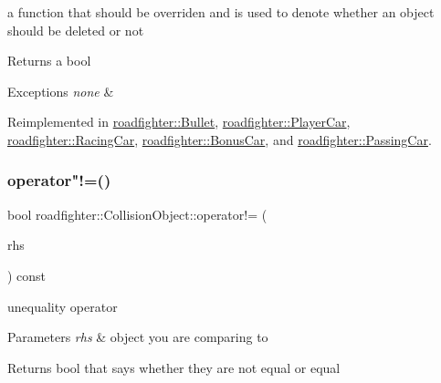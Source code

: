 a function that should be overriden and is used to denote whether an object should be deleted or not \begin{DoxyReturn}{Returns}
a bool 
\end{DoxyReturn}

\begin{DoxyExceptions}{Exceptions}
{\em none} & \\
\hline
\end{DoxyExceptions}


Reimplemented in \hyperlink{classroadfighter_1_1Bullet_a0f87b693a1583522e551ba1324fcd067}{roadfighter\+::\+Bullet}, \hyperlink{classroadfighter_1_1PlayerCar_aaf4dc181a4d21e544aecd7a8e538cfd6}{roadfighter\+::\+Player\+Car}, \hyperlink{classroadfighter_1_1RacingCar_a300bccb330cc8e84834edd5f85354a10}{roadfighter\+::\+Racing\+Car}, \hyperlink{classroadfighter_1_1BonusCar_a19d01e92134634a82ae53f0d017956aa}{roadfighter\+::\+Bonus\+Car}, and \hyperlink{classroadfighter_1_1PassingCar_a96b365c19d4e6e940d3827319434a022}{roadfighter\+::\+Passing\+Car}.

\mbox{\label{classroadfighter_1_1CollisionObject_ada8d62684274b10fc4f19e441413da23}} 
\subsubsection{\texorpdfstring{operator"!=()}{operator!=()}}
{\footnotesize\ttfamily bool roadfighter\+::\+Collision\+Object\+::operator!= (\begin{DoxyParamCaption}\item[{const \hyperlink{classroadfighter_1_1CollisionObject}{Collision\+Object} \&}]{rhs }\end{DoxyParamCaption}) const}

unequality operator 
\begin{DoxyParams}{Parameters}
{\em rhs} & object you are comparing to \\
\hline
\end{DoxyParams}
\begin{DoxyReturn}{Returns}
bool that says whether they are not equal or equal 
\end{DoxyReturn}
\mbox{\label{classroadfighter_1_1CollisionObject_a880034efde5a30ccc98c2ff3a2dc7c84}} 

